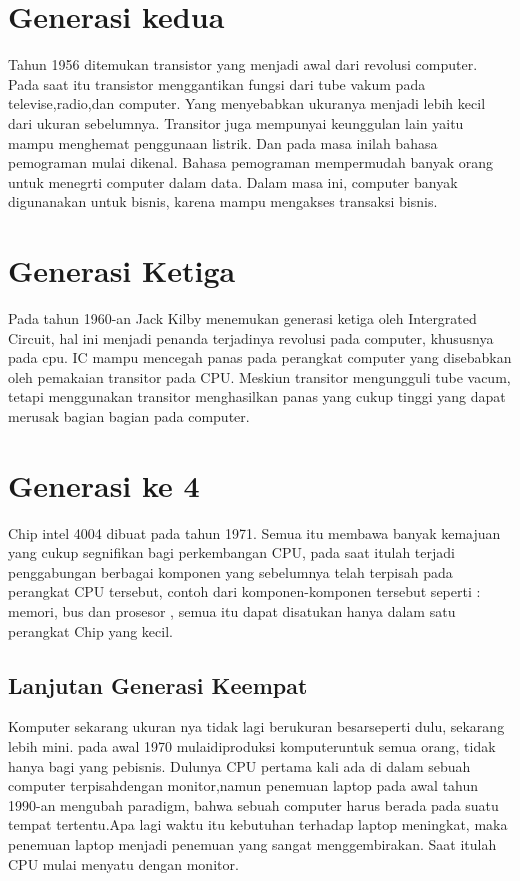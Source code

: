 	\section{Generasi kedua}
 Tahun 1956 ditemukan transistor yang menjadi awal dari revolusi computer. Pada saat itu transistor menggantikan fungsi dari tube vakum pada televise,radio,dan computer. Yang menyebabkan ukuranya menjadi lebih kecil dari ukuran sebelumnya. Transitor juga mempunyai keunggulan lain yaitu mampu menghemat penggunaan listrik.
 Dan pada masa inilah bahasa pemograman mulai dikenal. Bahasa pemograman mempermudah banyak orang untuk menegrti computer dalam data. Dalam masa ini, computer banyak digunanakan untuk bisnis, karena mampu mengakses transaksi bisnis.

 	\section{Generasi Ketiga}
 Pada tahun 1960-an Jack Kilby menemukan generasi ketiga oleh Intergrated Circuit, hal ini menjadi penanda terjadinya revolusi pada computer, khususnya pada cpu. IC mampu mencegah panas pada perangkat computer yang disebabkan oleh pemakaian transitor pada CPU.
 Meskiun transitor mengungguli tube vacum, tetapi menggunakan transitor menghasilkan panas yang cukup tinggi yang dapat merusak bagian bagian pada computer. 

 	\section{Generasi ke 4}
 Chip intel 4004 dibuat pada tahun 1971. Semua itu membawa banyak kemajuan yang cukup segnifikan bagi perkembangan CPU, pada saat itulah terjadi  penggabungan  berbagai komponen yang sebelumnya telah terpisah pada perangkat CPU tersebut, contoh dari komponen-komponen tersebut seperti : memori, bus dan prosesor , semua itu dapat disatukan hanya dalam satu perangkat Chip yang kecil.
	\subsection{Lanjutan Generasi Keempat}
 Komputer sekarang ukuran nya tidak lagi berukuran besarseperti dulu, sekarang lebih mini. pada awal 1970 mulaidiproduksi komputeruntuk semua orang, tidak hanya bagi yang pebisnis.
 Dulunya CPU pertama kali ada di dalam sebuah computer terpisahdengan monitor,namun penemuan laptop pada awal tahun 1990-an mengubah paradigm, bahwa sebuah computer harus berada pada suatu tempat tertentu.Apa lagi waktu itu kebutuhan terhadap laptop meningkat, maka penemuan laptop menjadi penemuan yang sangat menggembirakan. Saat itulah CPU mulai menyatu dengan monitor.


